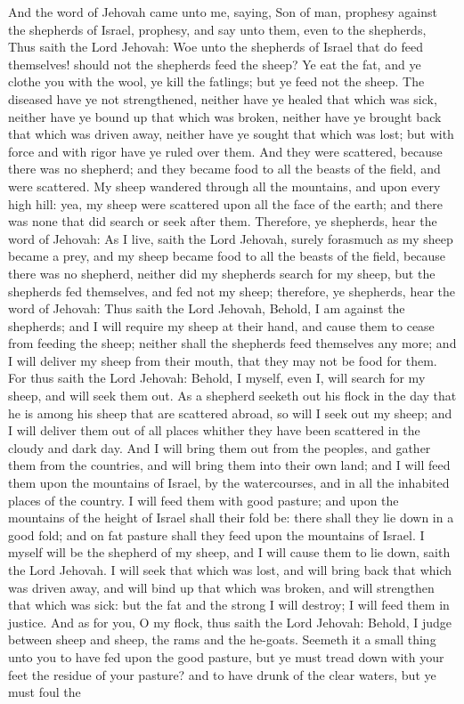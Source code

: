 And the word of Jehovah came unto me, saying, Son of man, prophesy against the shepherds of Israel, prophesy, and say unto them, even to the shepherds, Thus saith the Lord Jehovah: Woe unto the shepherds of Israel that do feed themselves! should not the shepherds feed the sheep? Ye eat the fat, and ye clothe you with the wool, ye kill the fatlings; but ye feed not the sheep. The diseased have ye not strengthened, neither have ye healed that which was sick, neither have ye bound up that which was broken, neither have ye brought back that which was driven away, neither have ye sought that which was lost; but with force and with rigor have ye ruled over them. And they were scattered, because there was no shepherd; and they became food to all the beasts of the field, and were scattered. My sheep wandered through all the mountains, and upon every high hill: yea, my sheep were scattered upon all the face of the earth; and there was none that did search or seek after them.  Therefore, ye shepherds, hear the word of Jehovah: As I live, saith the Lord Jehovah, surely forasmuch as my sheep became a prey, and my sheep became food to all the beasts of the field, because there was no shepherd, neither did my shepherds search for my sheep, but the shepherds fed themselves, and fed not my sheep; therefore, ye shepherds, hear the word of Jehovah: Thus saith the Lord Jehovah, Behold, I am against the shepherds; and I will require my sheep at their hand, and cause them to cease from feeding the sheep; neither shall the shepherds feed themselves any more; and I will deliver my sheep from their mouth, that they may not be food for them.  For thus saith the Lord Jehovah: Behold, I myself, even I, will search for my sheep, and will seek them out. As a shepherd seeketh out his flock in the day that he is among his sheep that are scattered abroad, so will I seek out my sheep; and I will deliver them out of all places whither they have been scattered in the cloudy and dark day. And I will bring them out from the peoples, and gather them from the countries, and will bring them into their own land; and I will feed them upon the mountains of Israel, by the watercourses, and in all the inhabited places of the country. I will feed them with good pasture; and upon the mountains of the height of Israel shall their fold be: there shall they lie down in a good fold; and on fat pasture shall they feed upon the mountains of Israel. I myself will be the shepherd of my sheep, and I will cause them to lie down, saith the Lord Jehovah. I will seek that which was lost, and will bring back that which was driven away, and will bind up that which was broken, and will strengthen that which was sick: but the fat and the strong I will destroy; I will feed them in justice.  And as for you, O my flock, thus saith the Lord Jehovah: Behold, I judge between sheep and sheep, the rams and the he-goats. Seemeth it a small thing unto you to have fed upon the good pasture, but ye must tread down with your feet the residue of your pasture? and to have drunk of the clear waters, but ye must foul the 